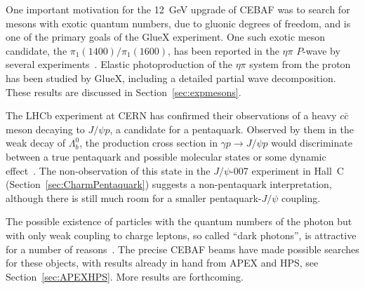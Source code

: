 One important motivation for the 12~GeV upgrade of CEBAF was to search for mesons with exotic quantum numbers, due to gluonic degrees of freedom, and is one of the primary goals of the GlueX experiment. One such exotic meson candidate, the $\pi_1(1400)/\pi_1(1600)$, has been reported in the $\eta\pi$ $P$-wave by several experiments~\cite{Zyla:2020zbs}. Elastic photoproduction of the $\eta\pi$ system from the proton has been studied by GlueX, including a detailed partial wave decomposition. These results are discussed in Section~\ref{sec:expmesons}.

The LHCb experiment at CERN has confirmed their observations of a heavy $c\bar{c}$ meson decaying to $J/\psi p$, a candidate for a pentaquark. Observed by them in the weak decay of $\Lambda_b^0$, the production cross section in $\gamma p\to J/\psi p$ would discriminate between a true pentaquark and possible molecular states or some dynamic effect~\cite{PhysRevD.100.054033}. The non-observation of this state in the $J/\psi$-007 experiment in Hall~C (Section~\ref{sec:CharmPentaquark}) suggests a non-pentaquark interpretation, although there is still much room for a smaller pentaquark-$J/\psi$ coupling.

The possible existence of particles with the quantum numbers of the photon but with only weak coupling to charge leptons, so called ``dark photons'', is attractive for a number of reasons~\cite{fabbrichesi2021physics}. The precise CEBAF beams have made possible searches for these objects, with results already in hand from APEX and HPS, see Section~\ref{sec:APEXHPS}. More results are forthcoming.

